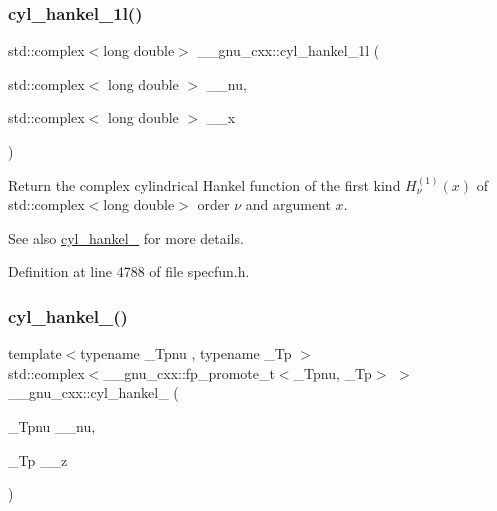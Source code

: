 \subsubsection{\texorpdfstring{cyl\+\_\+hankel\+\_\+1l()}{cyl\_hankel\_1l()}\hspace{0.1cm}{\footnotesize\ttfamily [2/2]}}
{\footnotesize\ttfamily std\+::complex$<$long double$>$ \+\_\+\+\_\+gnu\+\_\+cxx\+::cyl\+\_\+hankel\+\_\+1l (\begin{DoxyParamCaption}\item[{std\+::complex$<$ long double $>$}]{\+\_\+\+\_\+nu,  }\item[{std\+::complex$<$ long double $>$}]{\+\_\+\+\_\+x }\end{DoxyParamCaption})\hspace{0.3cm}{\ttfamily [inline]}}

Return the complex cylindrical Hankel function of the first kind $ H^{(1)}_\nu(x) $ of {\ttfamily std\+::complex$<$long double$>$} order $ \nu $ and argument $ x $.

\begin{DoxySeeAlso}{See also}
\hyperlink{group__gnu__math__spec__func_ga5329bba77d10a9d2f15d9bbe43a70db3}{cyl\+\_\+hankel\+\_} for more details. 
\end{DoxySeeAlso}


Definition at line 4788 of file specfun.\+h.

\mbox{\label{group__gnu__math__spec__func_ga7ebc71dd48ac97255d72f5f5f43dfd8e}} 
\subsubsection{\texorpdfstring{cyl\+\_\+hankel\+\_()}{cyl\_hankel\_2()}\hspace{0.1cm}{\footnotesize\ttfamily [1/2]}}
{\footnotesize\ttfamily template$<$typename \+\_\+\+Tpnu , typename \+\_\+\+Tp $>$ \\
std\+::complex$<$\+\_\+\+\_\+gnu\+\_\+cxx\+::fp\+\_\+promote\+\_\+t$<$\+\_\+\+Tpnu, \+\_\+\+Tp$>$ $>$ \+\_\+\+\_\+gnu\+\_\+cxx\+::cyl\+\_\+hankel\+\_ (\begin{DoxyParamCaption}\item[{\+\_\+\+Tpnu}]{\+\_\+\+\_\+nu,  }\item[{\+\_\+\+Tp}]{\+\_\+\+\_\+z }\end{DoxyParamCaption})\hspace{0.3cm}{\ttfamily [inline]}}


